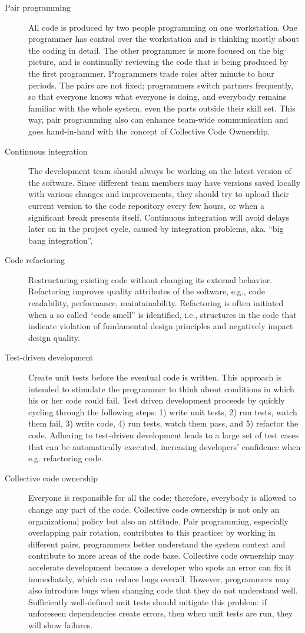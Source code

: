 \documentclass{scrreprt}
\begin{document}
\begin{description}
\item[Pair programming] All code is produced by two people programming  on one workstation. One programmer has control over the workstation and is thinking mostly about the coding in detail. The other programmer is more focused on the big picture, and is continually reviewing the code that is being produced by the first programmer. Programmers trade roles after minute to hour periods. The pairs are not fixed; programmers switch partners frequently, so that everyone knows what everyone is doing, and everybody remains familiar with the whole system, even the parts outside their skill set. This way, pair programming also can enhance team-wide communication and goes hand-in-hand with the concept of Collective Code Ownership.
\item[Continuous integration] The development team should always be working on the latest version of the software. Since different team members may have versions saved locally with various changes and improvements, they should try to upload their current version to the code repository every few hours, or when a significant break presents itself. Continuous integration will avoid delays later on in the project cycle, caused by integration problems, aka. ``big bang integration''.
\item[Code refactoring] Restructuring existing code without changing its external behavior. Refactoring improves quality attributes of the software, e.g., code readability, performance, maintainability. Refactoring is often initiated when a so called ``code smell'' is identified, i.e., structures in the code that indicate violation of fundamental design principles and negatively impact design quality. 
\item[Test-driven development] Create unit tests before the eventual code is written. This approach is intended to stimulate the programmer to think about conditions in which his or her code could fail. Test driven development proceeds by quickly cycling through the following steps: 1) write unit tests, 2) run tests, watch them fail, 3) write code, 4) run tests, watch them pass, and 5) refactor the code. Adhering to test-driven development leads to a large set of test cases that can be automatically executed, increasing developers' confidence when e.g. refactoring code.
\item[Collective code ownership] Everyone is responsible for all the code; therefore, everybody is allowed to change any part of the code. Collective code ownership is not only an organizational policy but also an attitude. Pair programming, especially overlapping pair rotation, contributes to this practice: by working in different pairs, programmers better understand the system context and contribute to more areas of the code base. Collective code ownership may accelerate development because a developer who spots an error can fix it immediately, which can reduce bugs overall. However, programmers may also introduce bugs when changing code that they do not understand well. Sufficiently well-defined unit tests should mitigate this problem: if unforeseen dependencies create errors, then when unit tests are run, they will show failures.

\end{description}
\end{document}
